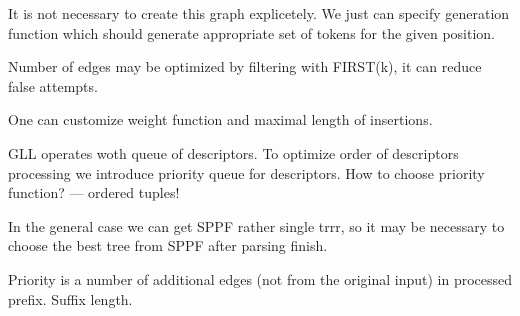 It is not necessary to create this graph explicetely.
We just can specify generation function which should generate appropriate set of tokens for the given position.

Number of edges may be optimized by filtering with FIRST(k), it can reduce false attempts.

One can customize weight function and maximal length of insertions.

GLL operates woth queue of descriptors.
To optimize order of descriptors processing we introduce priority queue for descriptors.
How to choose priority function? --- ordered tuples!

In the general case we can get SPPF rather single trrr, so it may be necessary to choose the best tree from SPPF after parsing finish.

Priority is a number of additional edges (not from the original input) in processed prefix.
Suffix length.
